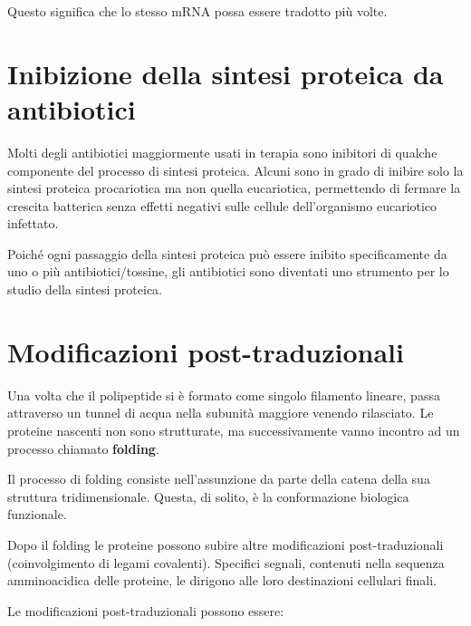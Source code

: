 \documentclass[11pt]{book}
\begin{document}
Questo significa che lo stesso mRNA possa essere tradotto più volte.

\section{Inibizione della sintesi proteica da
antibiotici}\label{inibizione-della-sintesi-proteica-da-antibiotici}

Molti degli antibiotici maggiormente usati in terapia sono inibitori di
qualche componente del processo di sintesi proteica. Alcuni sono in
grado di inibire solo la sintesi proteica procariotica ma non quella
eucariotica, permettendo di fermare la crescita batterica senza effetti
negativi sulle cellule dell'organismo eucariotico infettato.

Poiché ogni passaggio della sintesi proteica può essere inibito
specificamente da uno o più antibiotici/tossine, gli antibiotici sono
diventati uno strumento per lo studio della sintesi proteica.

\section{Modificazioni
post-traduzionali}\label{modificazioni-post-traduzionali}

Una volta che il polipeptide si è formato come singolo filamento
lineare, passa attraverso un tunnel di acqua nella subunità maggiore
venendo rilasciato. Le proteine nascenti non sono strutturate, ma
successivamente vanno incontro ad un processo chiamato \textbf{folding}.

Il processo di folding consiste nell'assunzione da parte della catena
della sua struttura tridimensionale. Questa, di solito, è la
conformazione biologica funzionale.

Dopo il folding le proteine possono subire altre modificazioni
post-traduzionali (coinvolgimento di legami covalenti). Specifici
segnali, contenuti nella sequenza amminoacidica delle proteine, le
dirigono alle loro destinazioni cellulari finali.

Le modificazioni post-traduzionali possono essere:
\end{document}
